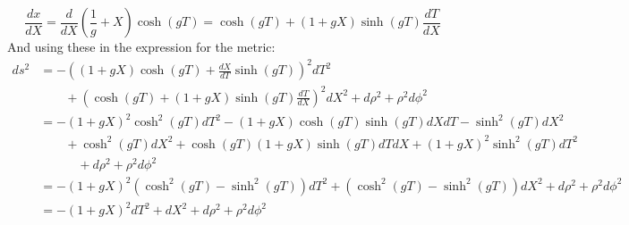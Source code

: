 \documentclass[12pt,a4]{article}
\begin{document}
\begin{enumerate}
\begin{enumerate}
\begin{equation*}
          \frac{d x}{dX} = \frac{d}{dX} \left(\frac{1}{g} + X\right) \cosh(gT) =  \cosh(gT) + \left(1 + gX\right) \sinh(gT) \frac{dT}{dX}
        \end{equation*}
        And using these in the expression for the metric:
        \begin{align*}
          ds^2  &= -\left(\left(1 + gX\right) \cosh(gT) + \frac{d X}{dT} \sinh(gT)\right)^2dT^2\\
                &\qquad + \left(\cosh(gT) + \left(1 + gX\right) \sinh(gT) \frac{dT}{dX}\right)^2 dX^2 + d\rho^2 + \rho^2d\phi^2\\
                &= -\left(1 + gX\right)^2 \cosh^2(gT)dT^2 - \left(1 + gX\right) \cosh(gT) \sinh(gT)dXdT - \sinh^2(gT) dX^2\\
                &\qquad + \cosh^2(gT)dX^2 + \cosh(gT)\left(1 + gX\right) \sinh(gT) dT dX + \left(1 + gX\right)^2 \sinh^2(gT) dT^2\\
                &\qquad \quad + d\rho^2 + \rho^2d\phi^2\\
                &= -\left(1 + gX\right)^2 (\cosh^2(gT) - \sinh^2(gT))dT^2  + (\cosh^2(gT) - \sinh^2(gT)) dX^2 + d\rho^2 + \rho^2d\phi^2\\
                &= -\left(1 + gX\right)^2 dT^2  +  dX^2 + d\rho^2 + \rho^2d\phi^2
        \end{align*}
    \end{enumerate}


\end{enumerate}
\end{document}
